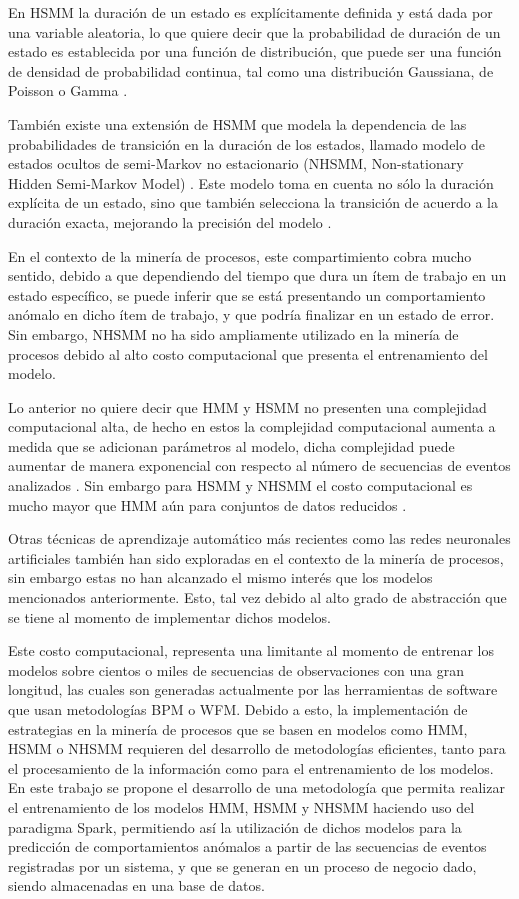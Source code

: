 En HSMM la duración de un estado es explícitamente definida y está dada por una variable aleatoria, lo que quiere decir que la probabilidad de duración de un estado es establecida por una función de distribución, que puede ser una función de densidad de probabilidad continua, tal como una distribución Gaussiana, de Poisson o Gamma \cite{Marhasev2006}. 

También existe una extensión de HSMM que modela la dependencia de las probabilidades de transición en la duración de los estados, llamado modelo de estados ocultos de semi-Markov no estacionario (NHSMM, Non-stationary Hidden Semi-Markov Model) \cite{Marhasev2006}. Este modelo toma en cuenta no sólo la duración explícita de un estado, sino que también selecciona la transición de acuerdo a la duración exacta, mejorando la precisión del modelo \cite{Marhasev2006}. 

En el contexto de la minería de procesos, este compartimiento cobra mucho sentido, debido a que dependiendo del tiempo que dura un ítem de trabajo en un estado específico, se puede inferir que se está presentando un comportamiento anómalo en dicho ítem de trabajo, y que podría finalizar en un estado de error. Sin embargo, NHSMM no ha sido ampliamente utilizado en la minería de procesos debido al alto costo computacional que presenta el entrenamiento del modelo.

Lo anterior no quiere decir que HMM y HSMM no presenten una complejidad computacional alta, de hecho en estos la complejidad computacional aumenta a medida que se adicionan parámetros al modelo, dicha complejidad puede aumentar de manera exponencial con respecto al número de secuencias de eventos analizados \cite{Maurer2014}. Sin embargo para HSMM y NHSMM el costo computacional es mucho mayor que HMM aún para conjuntos de datos reducidos \cite{Johnson2005}.

Otras técnicas de aprendizaje automático más recientes como las redes neuronales artificiales también han sido exploradas en el contexto de la minería de procesos, sin embargo estas no han alcanzado el mismo interés que los modelos mencionados anteriormente. Esto, tal vez debido al alto grado de abstracción que se tiene al momento de implementar dichos modelos. 

Este costo computacional, representa una limitante al momento de entrenar los modelos sobre cientos o miles de secuencias de observaciones con una gran longitud, las cuales son generadas actualmente por las herramientas de software que usan metodologías BPM o WFM. Debido a esto, la implementación de estrategias en la minería de procesos que se basen en modelos como HMM, HSMM o NHSMM requieren del desarrollo de metodologías eficientes, tanto para el procesamiento de la información como para el entrenamiento de los modelos. En este trabajo se propone el desarrollo de una metodología que permita realizar el entrenamiento de los modelos HMM, HSMM y NHSMM haciendo uso del paradigma Spark, permitiendo así la utilización de dichos modelos para la predicción de comportamientos anómalos a partir de las secuencias de eventos registradas por un sistema, y que se generan en un proceso de negocio dado, siendo almacenadas en una base de datos.


